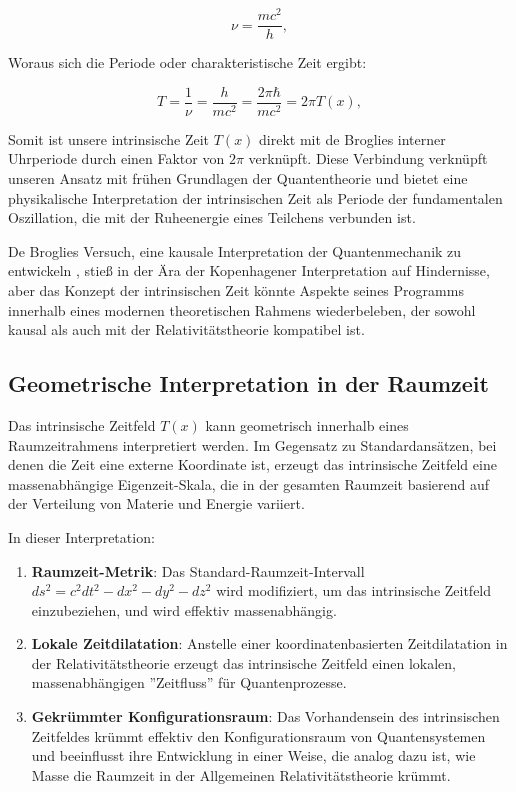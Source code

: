 \documentclass[12pt,a4paper]{article}
\newcommand{\Tfield}{T(x)}
\begin{document}
	\begin{equation}
		\nu = \frac{mc^2}{h},
		\label{eq:debroglie_frequency}
	\end{equation}
	
	Woraus sich die Periode oder charakteristische Zeit ergibt:
	
	\begin{equation}
		T = \frac{1}{\nu} = \frac{h}{mc^2} = \frac{2\pi\hbar}{mc^2} = 2\pi \Tfield,
		\label{eq:debroglie_period}
	\end{equation}
	
	Somit ist unsere intrinsische Zeit $\Tfield$ direkt mit de Broglies interner Uhrperiode durch einen Faktor von $2\pi$ verknüpft. Diese Verbindung verknüpft unseren Ansatz mit frühen Grundlagen der Quantentheorie und bietet eine physikalische Interpretation der intrinsischen Zeit als Periode der fundamentalen Oszillation, die mit der Ruheenergie eines Teilchens verbunden ist.
	
	De Broglies Versuch, eine kausale Interpretation der Quantenmechanik zu entwickeln \cite{deBroglie1927, deBroglie1930}, stieß in der Ära der Kopenhagener Interpretation auf Hindernisse, aber das Konzept der intrinsischen Zeit könnte Aspekte seines Programms innerhalb eines modernen theoretischen Rahmens wiederbeleben, der sowohl kausal als auch mit der Relativitätstheorie kompatibel ist.
	
	\subsection{Geometrische Interpretation in der Raumzeit}
	\label{subsec:geometric_interpretation}
	
	Das intrinsische Zeitfeld $\Tfield$ kann geometrisch innerhalb eines Raumzeitrahmens interpretiert werden. Im Gegensatz zu Standardansätzen, bei denen die Zeit eine externe Koordinate ist, erzeugt das intrinsische Zeitfeld eine massenabhängige Eigenzeit-Skala, die in der gesamten Raumzeit basierend auf der Verteilung von Materie und Energie variiert.
	
	In dieser Interpretation:
	
	\begin{enumerate}
		\item \textbf{Raumzeit-Metrik}: Das Standard-Raumzeit-Intervall $ds^2 = c^2dt^2 - dx^2 - dy^2 - dz^2$ wird modifiziert, um das intrinsische Zeitfeld einzubeziehen, und wird effektiv massenabhängig.
		
		\item \textbf{Lokale Zeitdilatation}: Anstelle einer koordinatenbasierten Zeitdilatation in der Relativitätstheorie erzeugt das intrinsische Zeitfeld einen lokalen, massenabhängigen ''Zeitfluss'' für Quantenprozesse.
		
		\item \textbf{Gekrümmter Konfigurationsraum}: Das Vorhandensein des intrinsischen Zeitfeldes krümmt effektiv den Konfigurationsraum von Quantensystemen und beeinflusst ihre Entwicklung in einer Weise, die analog dazu ist, wie Masse die Raumzeit in der Allgemeinen Relativitätstheorie krümmt.
	\end{enumerate}
	
\end{document}
